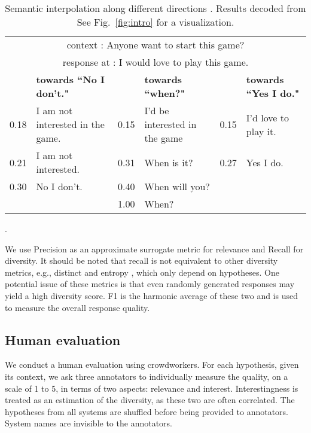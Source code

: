 \documentclass[11pt,a4paper]{article}
\begin{document}
\begin{table*}[ht]
    \centering
    \small
    \begin{tabular}{p{} p{}|p{} p{}|p{} p{}}  
    
    \hline
    
    \multicolumn{6}{c}{context : Anyone want to start this game?}\\
    \multicolumn{6}{c}{response at : I would love to play this game.}\\
    
    \hline
       & \textbf{towards ``No I don't."}           &     & \textbf{towards ``when?"}                 &     & \textbf{towards ``Yes I do."} \\ \hline
    0.18  & I am not interested in the game. & 0.15   & I'd be interested in the game    & 0.15   & I'd love to play it. \\
    0.21  & I am not interested.             & 0.31   & When is it?                      & 0.27   & Yes I do. \\
    0.30  & No I don't.                      & 0.40   & When will you?                   &        & \\
          &                                  & 1.00   & When?                            &        & \\ \hline
    
    \end{tabular}
    \caption{Semantic interpolation along different directions . Results decoded from  
    See Fig.~\ref{fig:intro} for a visualization.}.
    \label{table:direction}
\end{table*}
 
We use Precision as an approximate surrogate metric for relevance and Recall for diversity. It should be noted that recall is not equivalent to other diversity metrics, e.g., distinct \cite{li2016mmi} and entropy \cite{zhang2018gan}, which only depend on hypotheses. One potential issue of these metrics is that even randomly generated responses may yield a high diversity score. F1 is the harmonic average of these two and is used to measure the overall response quality.

\subsection{Human evaluation}

We conduct a human evaluation using crowdworkers. For each hypothesis, given its context, we ask three annotators to individually measure the quality, on a scale of 1 to 5, in terms of two aspects: relevance and interest.
Interestingness is treated as an estimation of the diversity, as these two are often correlated. The hypotheses from all systems are shuffled before being provided to annotators. System names are invisible to the annotators.
\end{document}
